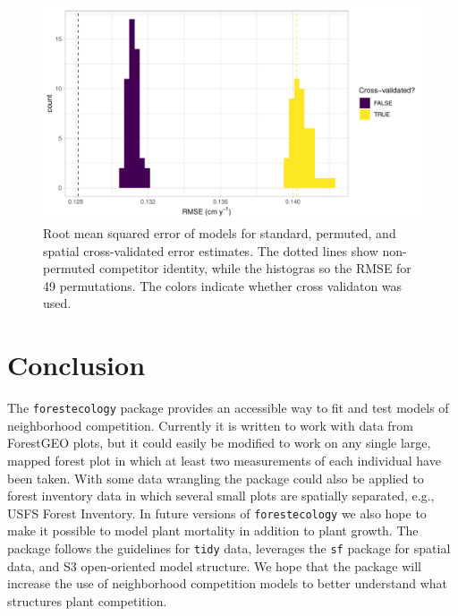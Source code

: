 \documentclass[12pt]{article}
\begin{document}
\begin{figure}

{\centering \includegraphics[width=1\linewidth]{simulation_results/2021-03-03_scbi_49_shuffles} 

}

\caption{Root mean squared error of models for standard, permuted, and spatial cross-validated error estimates. The dotted lines show non-permuted competitor identity, while the histogras so the RMSE for 49 permutations. The colors indicate whether cross validaton was used.}\label{fig:scbi-simulation}
\end{figure}

\hypertarget{conclusion}{%
\section{Conclusion}\label{conclusion}}

The \texttt{forestecology} package provides an accessible way to fit and
test models of neighborhood competition. Currently it is written to work
with data from ForestGEO plots, but it could easily be modified to work
on any single large, mapped forest plot in which at least two
measurements of each individual have been taken. With some data
wrangling the package could also be applied to forest inventory data in
which several small plots are spatially separated, e.g., USFS Forest
Inventory. In future versions of \texttt{forestecology} we also hope to
make it possible to model plant mortality in addition to plant growth.
The package follows the guidelines for \texttt{tidy} data, leverages the
\texttt{sf} package for spatial data, and S3 open-oriented model
structure. We hope that the package will increase the use of
neighborhood competition models to better understand what structures
plant competition.
\end{document}
